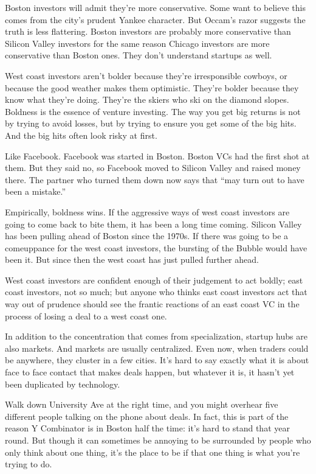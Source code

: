 Boston investors will admit they're more conservative. Some want to
believe this comes from the city's prudent Yankee character. But Occam's
razor suggests the truth is less flattering. Boston investors are
probably more conservative than Silicon Valley investors for the same
reason Chicago investors are more conservative than Boston ones. They
don't understand startups as well.

West coast investors aren't bolder because they're irresponsible
cowboys, or because the good weather makes them optimistic. They're
bolder because they know what they're doing. They're the skiers who ski
on the diamond slopes. Boldness is the essence of venture investing. The
way you get big returns is not by trying to avoid losses, but by trying
to ensure you get some of the big hits. And the big hits often look
risky at first.

Like Facebook. Facebook was started in Boston. Boston VCs had the first
shot at them. But they said no, so Facebook moved to Silicon Valley and
raised money there. The partner who turned them down now says that ``may
turn out to have been a mistake.''

Empirically, boldness wins. If the aggressive ways of west coast
investors are going to come back to bite them, it has been a long time
coming. Silicon Valley has been pulling ahead of Boston since the 1970s.
If there was going to be a comeuppance for the west coast investors, the
bursting of the Bubble would have been it. But since then the west coast
has just pulled further ahead.

West coast investors are confident enough of their judgement to act
boldly; east coast investors, not so much; but anyone who thinks east
coast investors act that way out of prudence should see the frantic
reactions of an east coast VC in the process of losing a deal to a west
coast one.

In addition to the concentration that comes from specialization, startup
hubs are also markets. And markets are usually centralized. Even now,
when traders could be anywhere, they cluster in a few cities. It's hard
to say exactly what it is about face to face contact that makes deals
happen, but whatever it is, it hasn't yet been duplicated by technology.

Walk down University Ave at the right time, and you might overhear five
different people talking on the phone about deals. In fact, this is part
of the reason Y Combinator is in Boston half the time: it's hard to
stand that year round. But though it can sometimes be annoying to be
surrounded by people who only think about one thing, it's the place to
be if that one thing is what you're trying to do.

